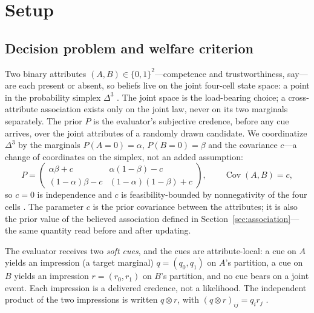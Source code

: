 \documentclass[review,12pt,authoryear]{elsarticle}
\theoremstyle{remark}
\theoremstyle{definition}
\newcommand{\anchor}[1]{}
\begin{document}
\section{Setup}
\label{sec:setup}

\subsection{Decision problem and welfare criterion}
\label{sec:decision}

Two binary attributes $(A,B)\in\{0,1\}^{2}$---competence and trustworthiness, say---are each
present or absent, so beliefs live on the joint four-cell state space: a point in the
probability simplex $\Delta^{3}$ \anchor{Setup}. The joint space is the load-bearing choice; a
cross-attribute association exists only on the joint law, never on its two marginals separately.
The prior $P$ is the evaluator's subjective credence, before any cue arrives, over the joint
attributes of a randomly drawn candidate. We coordinatize $\Delta^{3}$ by the marginals
$P(A{=}0)=\alpha$, $P(B{=}0)=\beta$ and the covariance $c$---a change of coordinates on the
simplex, not an added assumption:
\[
  P=\begin{pmatrix}\alpha\beta+c & \alpha(1-\beta)-c\\[2pt](1-\alpha)\beta-c & (1-\alpha)(1-\beta)+c\end{pmatrix},
  \qquad \operatorname{Cov}(A,B)=c,
\]
so $c=0$ is independence and $c$ is feasibility-bounded by nonnegativity of the four cells
\anchor{Setup}. The parameter $c$ is the prior covariance between the attributes; it is also the
prior value of the believed association defined in Section~\ref{sec:association}---the same
quantity read before and after updating.

The evaluator receives two \emph{soft cues}, and the cues are attribute-local: a cue on $A$
yields an impression (a target marginal) $q=(q_{0},q_{1})$ on $A$'s partition, a cue on $B$
yields an impression $r=(r_{0},r_{1})$ on $B$'s partition, and no cue bears on a joint event.
Each impression is a delivered credence, not a likelihood. The independent product of the two
impressions is written $q\otimes r$, with $(q\otimes r)_{ij}=q_{i}r_{j}$ \anchor{Setup}.
\end{document}

